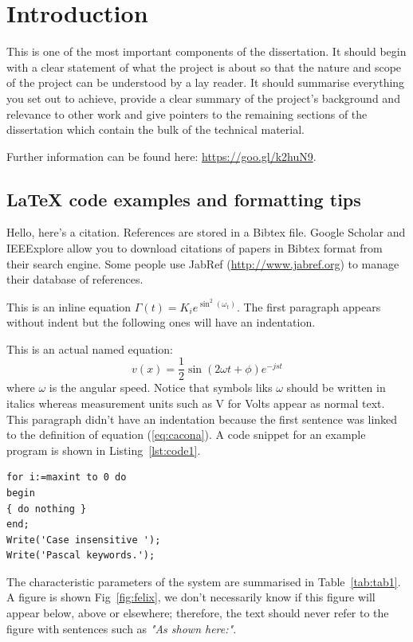 \chapter{Introduction}
This is one of the most important components of the dissertation. It should begin with a clear statement of what the project is about so that the nature and scope of the project can be understood by a lay reader. It should summarise everything you set out to achieve, provide a clear summary of the project's background and relevance to other work and give pointers to the remaining sections of the dissertation which contain the bulk of the technical material.

Further information can be found here: \url{https://goo.gl/k2huN9}.

\section{\LaTeX{} code examples and formatting tips}
Hello, here's a citation. References are stored in a Bibtex file. Google Scholar and IEEExplore allow you to download citations of papers in Bibtex format from their search engine. Some people use JabRef (\url{http://www.jabref.org}) to manage their database of references.

This is an inline equation $\Gamma(t)=K_i e^{\sin^2(\omega_t)}$. The first paragraph appears without indent but the following ones will have an indentation.

This is an actual named equation:
\begin{equation}
v(x)=\frac{1}{2}\sin(2 \omega t + \phi) e^{-j s t}
\label{eq:cacona}
\end{equation}
\noindent where $\omega$ is the angular speed. Notice that symbols liks $\omega$ should be written in italics whereas measurement units such as V for Volts appear as normal text. This paragraph didn't have an indentation because the first sentence was linked to the definition of equation (\ref{eq:cacona}). A code snippet for an example program is shown in Listing~\ref{lst:code1}.

\begin{lstlisting}[caption=Source code for {\it hello.m},label=lst:code1,breaklines=true,basewidth=4pt,prebreak=**,postbreak=**,frame=single]
for i:=maxint to 0 do
begin
{ do nothing }
end;
Write('Case insensitive ');
Write('Pascal keywords.');
\end{lstlisting}

The characteristic parameters of the system are summarised in Table~\ref{tab:tab1}. A figure is shown Fig~\ref{fig:felix}, we don't necessarily know if this figure will appear below, above or elsewhere; therefore, the text should never refer to the figure with sentences such as {\it "As shown here:"}.

